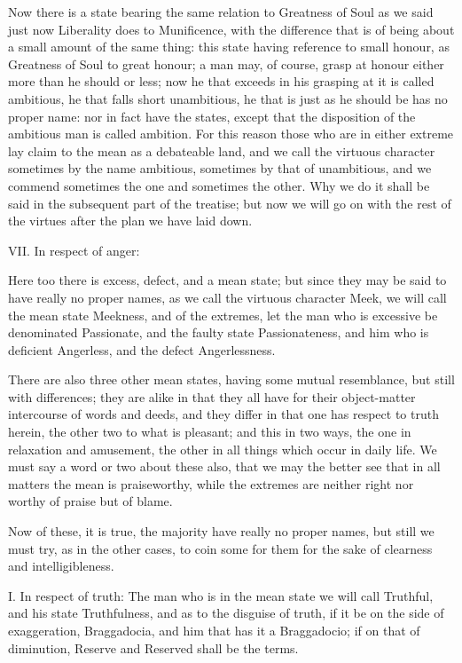 Now there is a state bearing the same relation to Greatness of Soul as
we said just now Liberality does to Munificence, with the difference
that is of being about a small amount of the same thing: this state
having reference to small honour, as Greatness of Soul to great honour;
a man may, of course, grasp at honour either more than he should or
less; now he that exceeds in his grasping at it is called ambitious, he
that falls short unambitious, he that is just as he should be has no
proper name: nor in fact have the states, except that the disposition of
the ambitious man is called ambition. For this reason those who are in
either extreme lay claim to the mean as a debateable land, and we call
the virtuous character sometimes by the name ambitious, sometimes by
that of unambitious, and we commend sometimes the one and sometimes
the other. Why we do it shall be said in the subsequent part of the
treatise; but now we will go on with the rest of the virtues after the
plan we have laid down.

VII. In respect of anger:

Here too there is excess, defect, and a mean state; but since they
may be said to have really no proper names, as we call the virtuous
character Meek, we will call the mean state Meekness, and of the
extremes, let the man who is excessive be denominated Passionate, and
the faulty state Passionateness, and him who is deficient Angerless, and
the defect Angerlessness.

There are also three other mean states, having some mutual resemblance,
but still with differences; they are alike in that they all have for
their object-matter intercourse of words and deeds, and they differ in
that one has respect to truth herein, the other two to what is pleasant;
and this in two ways, the one in relaxation and amusement, the other in
all things which occur in daily life. We must say a word or two about
these also, that we may the better see that in all matters the mean is
praiseworthy, while the extremes are neither right nor worthy of praise
but of blame.

Now of these, it is true, the majority have really no proper names, but
still we must try, as in the other cases, to coin some for them for the
sake of clearness and intelligibleness.

I. In respect of truth: The man who is in the mean state we will call
Truthful, and his state Truthfulness, and as to the disguise of truth,
if it be on the side of exaggeration, Braggadocia, and him that has it a
Braggadocio; if on that of diminution, Reserve and Reserved shall be the
terms.

